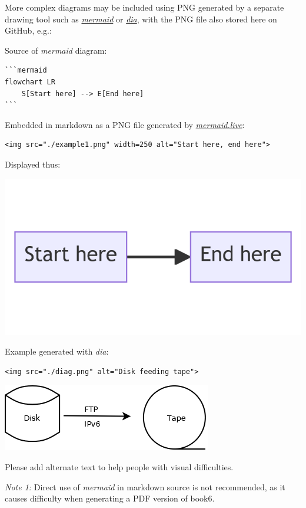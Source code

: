 \documentclass[
]{article}
\begin{document}
More complex diagrams may be included using PNG generated by a separate
drawing tool such as \href{https://mermaid.live}{\emph{mermaid}} or
\href{http://dia-installer.de/}{\emph{dia}}, with the PNG file also
stored here on GitHub, e.g.:

Source of \emph{mermaid} diagram:

\begin{verbatim}
```mermaid
flowchart LR
    S[Start here] --> E[End here]
```
\end{verbatim}

Embedded in markdown as a PNG file generated by
\href{https://mermaid.live}{\emph{mermaid.live}}:

\begin{verbatim}
<img src="./example1.png" width=250 alt="Start here, end here">
\end{verbatim}

Displayed thus:

\includegraphics{example1.png}

Example generated with \emph{dia}:

\begin{verbatim}
<img src="./diag.png" alt="Disk feeding tape">
\end{verbatim}

\includegraphics{diag.png}

Please add alternate text to help people with visual difficulties.

\emph{Note 1:} Direct use of \emph{mermaid} in markdown source is not
recommended, as it causes difficulty when generating a PDF version of
book6.
\end{document}
